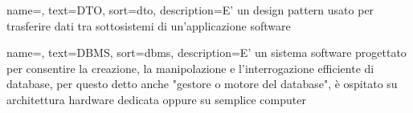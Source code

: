 {
    name=,
    text=DTO,
    sort=dto,
    description={E' un design pattern usato per trasferire dati tra sottosistemi di un'applicazione software}
}

{
    name=,
    text=DBMS,
    sort=dbms,
    description={E' un sistema software progettato per consentire la creazione, la manipolazione e l'interrogazione efficiente di database, per questo detto anche "gestore o motore del database", è ospitato su architettura hardware dedicata oppure su semplice computer}
}
